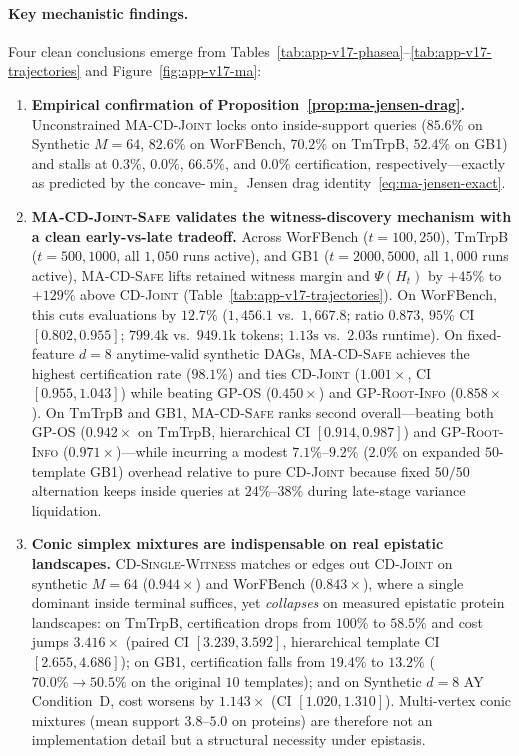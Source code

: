 \documentclass{article}
\theoremstyle{plain}
\theoremstyle{definition}
\begin{document}
\paragraph{Key mechanistic findings.}
Four clean conclusions emerge from Tables~\ref{tab:app-v17-phasea}--\ref{tab:app-v17-trajectories} and Figure~\ref{fig:app-v17-ma}:
\begin{enumerate}[leftmargin=1.6em]
  \item \textbf{Empirical confirmation of Proposition~\ref{prop:ma-jensen-drag}.} Unconstrained \textsc{MA-CD-Joint} locks onto inside-support queries ($85.6\%$ on Synthetic $M{=}64$, $82.6\%$ on WorFBench, $70.2\%$ on TmTrpB, $52.4\%$ on GB1) and stalls at $0.3\%$, $0.0\%$, $66.5\%$, and $0.0\%$ certification, respectively---exactly as predicted by the concave-$\min_z$ Jensen drag identity~\eqref{eq:ma-jensen-exact}.
  \item \textbf{\textsc{MA-CD-Joint-Safe} validates the witness-discovery mechanism with a clean early-vs-late tradeoff.} Across WorFBench ($t=100,250$), TmTrpB ($t=500,1000$, all $1{,}050$ runs active), and GB1 ($t=2000,5000$, all $1{,}000$ runs active), \textsc{MA-CD-Safe} lifts retained witness margin and $\Psi(H_t)$ by $+45\%$ to $+129\%$ above \textsc{CD-Joint} (Table~\ref{tab:app-v17-trajectories}). On WorFBench, this cuts evaluations by $12.7\%$ ($1{,}456.1$ vs.\ $1{,}667.8$; ratio $0.873$, $95\%$ CI $[0.802, 0.955]$; $799.4\mathrm{k}$ vs.\ $949.1\mathrm{k}$ tokens; $1.13\mathrm{s}$ vs.\ $2.03\mathrm{s}$ runtime). On fixed-feature $d=8$ anytime-valid synthetic DAGs, \textsc{MA-CD-Safe} achieves the highest certification rate ($98.1\%$) and ties \textsc{CD-Joint} ($1.001\times$, CI $[0.955, 1.043]$) while beating \textsc{GP-OS} ($0.450\times$) and \textsc{GP-Root-Info} ($0.858\times$). On TmTrpB and GB1, \textsc{MA-CD-Safe} ranks second overall---beating both \textsc{GP-OS} ($0.942\times$ on TmTrpB, hierarchical CI $[0.914, 0.987]$) and \textsc{GP-Root-Info} ($0.971\times$)---while incurring a modest $7.1\%$--$9.2\%$ ($2.0\%$ on expanded $50$-template GB1) overhead relative to pure \textsc{CD-Joint} because fixed $50/50$ alternation keeps inside queries at $24\%$--$38\%$ during late-stage variance liquidation.
  \item \textbf{Conic simplex mixtures are indispensable on real epistatic landscapes.} \textsc{CD-Single-Witness} matches or edges out \textsc{CD-Joint} on synthetic $M=64$ ($0.944\times$) and WorFBench ($0.843\times$), where a single dominant inside terminal suffices, yet \emph{collapses} on measured epistatic protein landscapes: on TmTrpB, certification drops from $100\%$ to $58.5\%$ and cost jumps $3.416\times$ (paired CI $[3.239, 3.592]$, hierarchical template CI $[2.655, 4.686]$); on GB1, certification falls from $19.4\%$ to $13.2\%$ ($70.0\% \to 50.5\%$ on the original $10$ templates); and on Synthetic $d=8$ AY Condition~D, cost worsens by $1.143\times$ (CI $[1.020, 1.310]$). Multi-vertex conic mixtures (mean support $3.8$--$5.0$ on proteins) are therefore not an implementation detail but a structural necessity under epistasis.

\end{enumerate}
\end{document}
